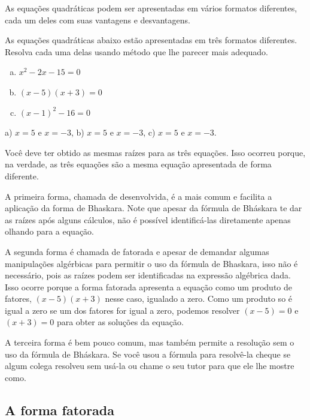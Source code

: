 \documentclass[main.tex]{subfiles}
\begin{document}
As equações quadráticas podem ser apresentadas em vários formatos diferentes, cada um deles com suas vantagens e desvantagens. 

\begin{questao}
 As equações quadráticas abaixo estão apresentadas em três formatos diferentes. Resolva cada uma delas usando método que lhe parecer mais adequado.
\begin{enumerate}[a)]
\item $x^2-2x-15=0$
\item $(x-5)(x+3)=0$
\item $(x-1)^2-16=0$
\end{enumerate}
\end{questao}

\begin{gabarito}
	\begin{gabaritoQuestao}
		a) $x=5$ e $x=-3$, b) $x=5$ e $x=-3$, c) $x=5$ e $x=-3$.
	\end{gabaritoQuestao}
\end{gabarito}

Você deve ter obtido as mesmas raízes para as três equações. Isso ocorreu porque, na verdade, as três equações são a mesma equação apresentada de forma diferente.

A primeira forma, chamada de desenvolvida, é a mais comum e facilita a aplicação da forma de Bhaskara. Note que apesar da fórmula de Bháskara te dar as raízes após alguns cálculos, não é possível identificá-las diretamente apenas olhando para a equação.

A segunda forma é chamada de fatorada e apesar de demandar algumas manipulações algérbicas para permitir o uso da fórmula de Bhaskara, isso não é necessário, pois as raízes podem ser identificadas na expressão algébrica dada. Isso ocorre porque a forma fatorada apresenta a equação como um produto de fatores, $(x-5)(x+3)$ nesse caso, igualado a zero. Como um produto so é igual a zero se um dos fatores for igual a zero, podemos resolver $(x-5)=0$ e $(x+3)=0$ para obter as soluções da equação.

A terceira forma é bem pouco comum, mas também permite a resolução sem o uso da fórmula de Bháskara. Se você usou a fórmula para resolvê-la cheque se algum colega resolveu sem usá-la ou chame o seu tutor para que ele lhe mostre como.

\subsection*{A forma fatorada}
\end{document}
